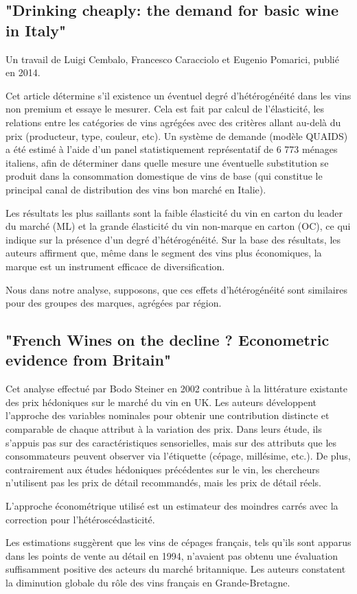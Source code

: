 \documentclass[11pt, a4paper]{article}
\begin{document}
\subsection*{"Drinking cheaply: the demand for basic wine in Italy"}
Un travail de Luigi Cembalo, Francesco Caracciolo et Eugenio Pomarici, publié en 2014.
\par
Cet article détermine s'il existence un éventuel degré d’hétérogénéité dans les vins non premium et essaye le mesurer.
Cela est fait par calcul de l’élasticité, les relations entre les catégories de vins agrégées avec des critères allant au-delà du prix (producteur, type, couleur, etc). 
Un système de demande (modèle QUAIDS) a été estimé à l'aide d'un panel statistiquement représentatif de 6 773 ménages italiens, afin de déterminer dans quelle mesure une éventuelle substitution se produit dans la consommation domestique de vins de base (qui constitue le principal canal de distribution des vins bon marché en Italie).
\par
Les résultats les plus saillants sont la faible élasticité du vin en carton du leader du marché (ML) et la grande élasticité du vin non-marque en carton (OC), ce qui indique sur la présence d'un degré d'hétérogénéité. 
Sur la base des résultats, les auteurs affirment que, même dans le segment des vins plus économiques, la marque est un instrument efficace de diversification.
\par
Nous dans notre analyse, supposons, que ces effets d'hétérogénéité sont similaires pour des groupes des marques, agrégées par région.

\subsection*{"French Wines on the decline ? Econometric evidence from Britain"}
Cet analyse effectué par Bodo Steiner en 2002 contribue à la littérature existante des prix hédoniques sur le marché du vin en UK. 
Les auteurs développent l’approche des variables nominales %
pour obtenir une contribution distincte et comparable de chaque attribut à la variation des prix. 
Dans leurs étude, %
ils s'appuis pas sur des caractéristiques sensorielles, mais sur des attributs que les consommateurs peuvent observer via l'étiquette (cépage, millésime, etc.). 
De plus, contrairement aux études hédoniques précédentes sur le vin, les chercheurs n'utilisent pas les prix de détail recommandés, mais les prix de détail réels.
\par
L’approche économétrique utilisé est un estimateur des moindres carrés avec la correction pour l’hétéroscédasticité. 
\par
Les estimations suggèrent que les vins de cépages français, tels qu’ils sont apparus dans les points de vente au détail en 1994, n’avaient pas obtenu une évaluation suffisamment positive des acteurs du marché britannique. 
Les auteurs constatent la diminution globale du rôle des vins français en Grande-Bretagne.
\end{document}
